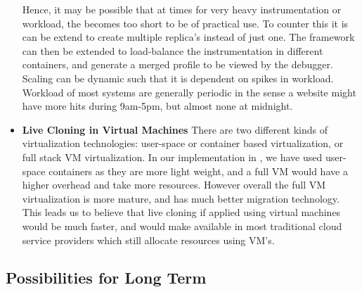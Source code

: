 \begin{itemize}
	Hence, it may be possible that at times for very heavy instrumentation or workload, the \debugwindow becomes too short to be of practical use. To counter this it is \parikshan can be extend to create multiple replica's instead of just one. The framework can then be extended to load-balance the instrumentation in different containers, and generate a merged profile to be viewed by the debugger.
	Scaling can be dynamic such that it is dependent on spikes in workload. 
	Workload of most systems are generally periodic in the sense a website might have more hits during 9am-5pm, but almost none at midnight.

	\item \textbf{Live Cloning in Virtual Machines}
	There are two different kinds of virtualization technologies: user-space or container based virtualization, or full stack VM virtualization.
	In our implementation in \parikshan, we have used user-space containers as they are more light weight, and a full VM would have a higher overhead and take more resources. 
	However overall the full VM virtualization is more mature, and has much better migration technology.
	This leads us to believe that live cloning if applied using virtual machines would be much faster, and would make \parikshan available in most traditional cloud service providers which still allocate resources using VM's.
	
\end{itemize}

\subsection{Possibilities for Long Term}
\label{sec:longterm}

